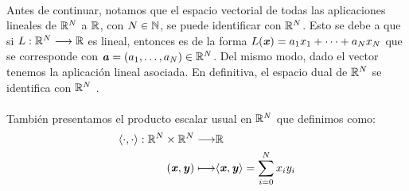 	
	\paragraph{}Antes de continuar, notamos que el espacio vectorial de todas las aplicaciones lineales de $ \mathbb{R}^N $ a $ \mathbb{R} $, con $ N \in \mathbb{N} $, se puede identificar con $ \mathbb{R}^N $. Esto se debe a que si $ L:\mathbb{R}^N \longrightarrow \mathbb{R} $ es lineal, entonces es de la forma $ L(\textbf{\emph{x}}) = a_1x_1 + \cdots + a_Nx_N $ que se corresponde con $ \textbf{\emph{a}} = (a_1,\dots,a_N) \in \mathbb{R}^N $. Del mismo modo, dado el vector tenemos la aplicación lineal asociada. En definitiva, el espacio dual de 
	$ \mathbb{R}^N $ se identifica con $ \mathbb{R}^N $ .
	\paragraph{} También presentamos el producto escalar usual en $ \mathbb{R}^N $ que definimos como:
	\[
	\begin{split}
	\langle \cdot, \cdot \rangle : \mathbb{R}^N \times \mathbb{R}^N \longrightarrow &\mathbb{R} \\
	(\textbf{\emph{x}}, \textbf{\emph{y}}) \longmapsto &\langle \textbf{\emph{x}}, \textbf{\emph{y}} \rangle = \sum_{i=0}^{N}x_iy_i
	\end{split}
	\]

